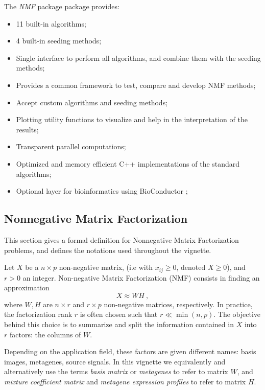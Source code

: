 \documentclass[a4paper]{article}\usepackage{graphicx, color}
\newcommand{\pkgname}[1]{\textit{#1}\xspace}
\newcommand{\Rpkg}[1]{\pkgname{#1} package\xspace}
\newcommand{\nmfpack}{\Rpkg{NMF}}
\renewcommand{\cite}[1]{\parencite{#1}}
\begin{document}
The \nmfpack package provides:
\begin{itemize}
\item 11 built-in algorithms;
\item 4 built-in seeding methods;
\item Single interface to perform all algorithms, and combine them with the seeding methods;
\item Provides a common framework to test, compare and develop NMF methods;
\item Accept custom algorithms and seeding methods;
\item Plotting utility functions to visualize and help in the interpretation of the results;
\item Transparent parallel computations;
\item Optimized and memory efficient C++ implementations of the standard algorithms;
\item Optional layer for bioinformatics using BioConductor \cite{Gentleman2004};
\end{itemize}

\subsection{Nonnegative Matrix Factorization}

This section gives a formal definition for Nonnegative Matrix Factorization problems, and defines the notations used throughout the vignette. 

Let $X$ be a $n \times p$ non-negative matrix, (i.e with $x_{ij} \geq 0$,
denoted $X \geq 0$), and $r > 0$ an integer. Non-negative Matrix Factorization (NMF) consists in finding an approximation
\begin{equation}
X \approx W H\ , \label{NMFstd}
\end{equation}
where $W, H$ are $n\times r$ and $r \times p$ non-negative matrices, respectively. 
In practice, the factorization rank $r$ is often chosen such that $r \ll \min(n, p)$. 
The objective behind this choice is to summarize and split the information contained in $X$ into $r$ factors: the columns of $W$. 

Depending on the application field, these factors are given different names: basis images, metagenes, source signals. In this vignette we equivalently and alternatively use the terms 
\emph{basis matrix} or \emph{metagenes} to refer to matrix $W$, and \emph{mixture coefficient matrix} and \emph{metagene expression profiles} to refer to matrix $H$.
\end{document}
